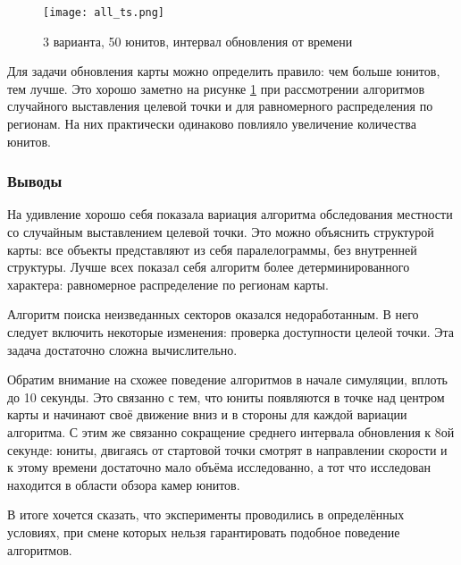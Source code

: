 \begin{figure}[h!]
    \centering
    \texttt{[image: all\_ts.png]}
    \caption{3 варианта, 50 юнитов, интервал обновления от времени}
    \label{fig:all_ts}
\end{figure}

Для задачи обновления карты можно определить правило: чем больше юнитов, тем
лучше. Это хорошо заметно на рисунке \ref{fig:all_ts} при рассмотрении
алгоритмов случайного выставления целевой точки и для равномерного распределения
по регионам. На них практически одинаково повлияло увеличение количества юнитов.

\clearpage

\subsubsection{Выводы}

На удивление хорошо себя показала вариация алгоритма обследования местности
со случайным выставлением целевой точки. Это можно объяснить структурой карты:
все объекты представляют из себя паралелограммы, без внутренней структуры.
Лучше всех показал себя алгоритм более детерминированного характера:
равномерное распределение по регионам карты.

Алгоритм поиска неизведанных секторов оказался недоработанным. В него следует
включить некоторые изменения: проверка доступности целеой точки. Эта задача
достаточно сложна вычислительно.

Обратим внимание на схожее поведение алгоритмов в начале симуляции, вплоть до
10 секунды. Это связанно с тем, что юниты появляются в точке над центром карты
и начинают своё движение вниз и в стороны для каждой вариации алгоритма.
С этим же связанно сокращение среднего интервала обновления к 8ой секунде:
юниты, двигаясь от стартовой точки смотрят в направлении скорости и к этому
времени достаточно мало объёма исследованно, а тот что исследован находится
в области обзора камер юнитов.

В итоге хочется сказать, что эксперименты проводились в определённых
условиях, при смене которых нельзя гарантировать подобное поведение
алгоритмов.

\clearpage
\newpage
